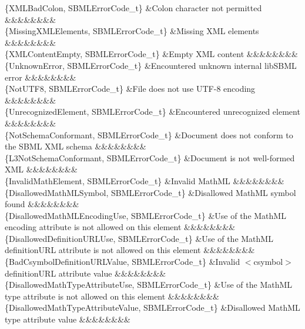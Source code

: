 \begin{DoxyParagraph}{}
\begin{longtabu}
\{X\+M\+L\+Bad\+Colon, S\+B\+M\+L\+Error\+Code\+\_\+t\} &Colon character not permitted &&&&&&&&\\
\{Missing\+X\+M\+L\+Elements, S\+B\+M\+L\+Error\+Code\+\_\+t\} &Missing X\+ML elements &&&&&&&&\\
\{X\+M\+L\+Content\+Empty, S\+B\+M\+L\+Error\+Code\+\_\+t\} &Empty X\+ML content &&&&&&&&\\
\{Unknown\+Error, S\+B\+M\+L\+Error\+Code\+\_\+t\} &Encountered unknown internal lib\+S\+B\+ML error &&&&&&&&\\
\{Not\+U\+T\+F8, S\+B\+M\+L\+Error\+Code\+\_\+t\} &File does not use U\+T\+F-\/8 encoding &&&&&&&&\\
\{Unrecognized\+Element, S\+B\+M\+L\+Error\+Code\+\_\+t\} &Encountered unrecognized element &&&&&&&&\\
\{Not\+Schema\+Conformant, S\+B\+M\+L\+Error\+Code\+\_\+t\} &Document does not conform to the S\+B\+ML X\+ML schema &&&&&&&&\\
\{L3\+Not\+Schema\+Conformant, S\+B\+M\+L\+Error\+Code\+\_\+t\} &Document is not well-\/formed X\+ML &&&&&&&&\\
\{Invalid\+Math\+Element, S\+B\+M\+L\+Error\+Code\+\_\+t\} &Invalid Math\+ML &&&&&&&&\\
\{Disallowed\+Math\+M\+L\+Symbol, S\+B\+M\+L\+Error\+Code\+\_\+t\} &Disallowed Math\+ML symbol found &&&&&&&&\\
\{Disallowed\+Math\+M\+L\+Encoding\+Use, S\+B\+M\+L\+Error\+Code\+\_\+t\} &Use of the Math\+ML \textquotesingle{}encoding\textquotesingle{} attribute is not allowed on this element &&&&&&&&\\
\{Disallowed\+Definition\+U\+R\+L\+Use, S\+B\+M\+L\+Error\+Code\+\_\+t\} &Use of the Math\+ML \textquotesingle{}definition\+U\+RL\textquotesingle{} attribute is not allowed on this element &&&&&&&&\\
\{Bad\+Csymbol\+Definition\+U\+R\+L\+Value, S\+B\+M\+L\+Error\+Code\+\_\+t\} &Invalid {\ttfamily $<$csymbol$>$} \textquotesingle{}definition\+U\+RL\textquotesingle{} attribute value &&&&&&&&\\
\{Disallowed\+Math\+Type\+Attribute\+Use, S\+B\+M\+L\+Error\+Code\+\_\+t\} &Use of the Math\+ML \textquotesingle{}type\textquotesingle{} attribute is not allowed on this element &&&&&&&&\\
\{Disallowed\+Math\+Type\+Attribute\+Value, S\+B\+M\+L\+Error\+Code\+\_\+t\} &Disallowed Math\+ML \textquotesingle{}type\textquotesingle{} attribute value &&&&&&&&\\

\end{longtabu}
\end{DoxyParagraph}
